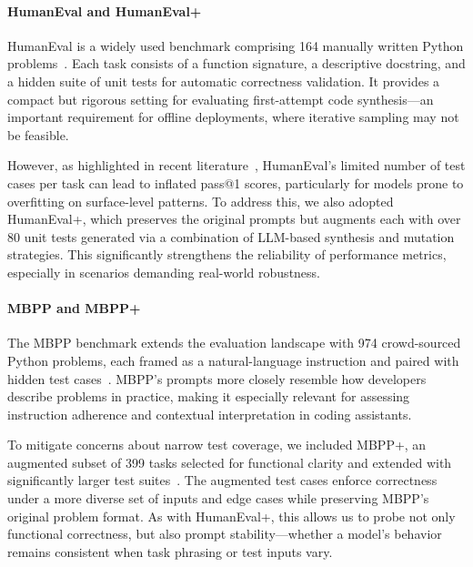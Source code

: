 \paragraph{HumanEval and HumanEval+}
HumanEval is a widely used benchmark comprising 164 manually written Python problems~\autocite{Chen2021}. Each task consists of a function signature, a descriptive docstring, and a hidden suite of unit tests for automatic correctness validation. It provides a compact but rigorous setting for evaluating first-attempt code synthesis—an important requirement for offline deployments, where iterative sampling may not be feasible.

However, as highlighted in recent literature~\autocite{Liu2023Rigorous}, HumanEval’s limited number of test cases per task can lead to inflated pass@1 scores, particularly for models prone to overfitting on surface-level patterns. To address this, we also adopted HumanEval+, which preserves the original prompts but augments each with over 80 unit tests generated via a combination of LLM-based synthesis and mutation strategies. This significantly strengthens the reliability of performance metrics, especially in scenarios demanding real-world robustness.

\paragraph{MBPP and MBPP+}
The \gls{MBPP} benchmark extends the evaluation landscape with 974 crowd-sourced Python problems, each framed as a natural-language instruction and paired with hidden test cases~\autocite{Austin2021}. MBPP’s prompts more closely resemble how developers describe problems in practice, making it especially relevant for assessing instruction adherence and contextual interpretation in coding assistants.

To mitigate concerns about narrow test coverage, we included MBPP+, an augmented subset of 399 tasks selected for functional clarity and extended with significantly larger test suites~\autocite{Liu2023Rigorous}. The augmented test cases enforce correctness under a more diverse set of inputs and edge cases while preserving MBPP’s original problem format. As with HumanEval+, this allows us to probe not only functional correctness, but also prompt stability—whether a model’s behavior remains consistent when task phrasing or test inputs vary.


